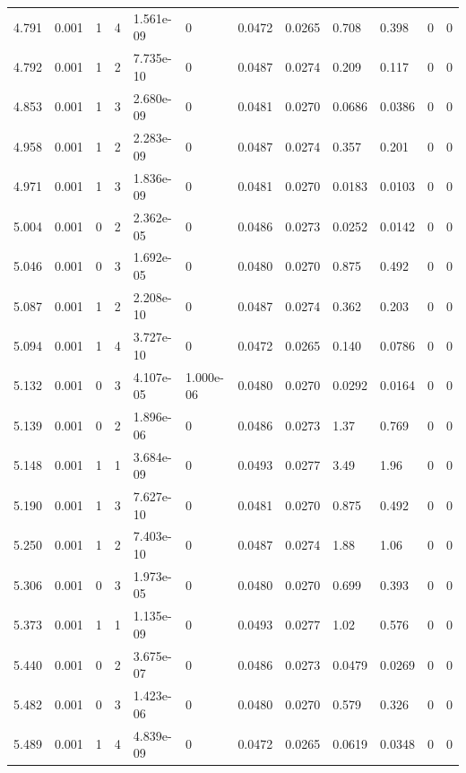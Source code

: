 \documentclass[preview]{standalone}
\begin{document}
{{{{\begin{tabular}{L{1.2cm}C{1.2cm} C{0.3cm}C{0.5cm} C{1.4cm}C{1.4cm} C{1.4cm}C{1.4cm} C{1.6cm}C{1.6cm} C{1.6cm}C{1.6cm}}
  4.791  &  0.001  & 1     &  4 &  1.561e-09  & 0  &  0.0472&   0.0265& 0.708 & 0.398   &  0 & 0  \\ 
  4.792  &  0.001  & 1     &  2 &  7.735e-10  & 0  &  0.0487&   0.0274& 0.209 & 0.117   &  0 & 0  \\ 
  4.853  &  0.001  & 1     &  3 &  2.680e-09  & 0  &  0.0481&   0.0270& 0.0686 & 0.0386   &  0 & 0  \\ 
  4.958  &  0.001  & 1     &  2 &  2.283e-09  & 0  &  0.0487&   0.0274& 0.357 & 0.201   &  0 & 0  \\ 
  4.971  &  0.001  & 1     &  3 &  1.836e-09  & 0  &  0.0481&   0.0270& 0.0183 & 0.0103   &  0 & 0  \\ 
  5.004  &  0.001  & 0     &  2 &  2.362e-05  & 0  &  0.0486&   0.0273& 0.0252 & 0.0142   &  0 & 0  \\ 
  5.046  &  0.001  & 0     &  3 &  1.692e-05  & 0  &  0.0480&   0.0270& 0.875 & 0.492   &  0 & 0  \\ 
  5.087  &  0.001  & 1     &  2 &  2.208e-10  & 0  &  0.0487&   0.0274& 0.362 & 0.203   &  0 & 0  \\ 
  5.094  &  0.001  & 1     &  4 &  3.727e-10  & 0  &  0.0472&   0.0265& 0.140 & 0.0786   &  0 & 0  \\ 
  5.132  &  0.001  & 0     &  3 &  4.107e-05  & 1.000e-06  &  0.0480&   0.0270& 0.0292 & 0.0164   &  0 & 0  \\ 
  5.139  &  0.001  & 0     &  2 &  1.896e-06  & 0  &  0.0486&   0.0273& 1.37 & 0.769   &  0 & 0  \\ 
  5.148  &  0.001  & 1     &  1 &  3.684e-09  & 0  &  0.0493&   0.0277& 3.49 & 1.96   &  0 & 0  \\ 
  5.190  &  0.001  & 1     &  3 &  7.627e-10  & 0  &  0.0481&   0.0270& 0.875 & 0.492   &  0 & 0  \\ 
  5.250  &  0.001  & 1     &  2 &  7.403e-10  & 0  &  0.0487&   0.0274& 1.88 & 1.06   &  0 & 0  \\ 
  5.306  &  0.001  & 0     &  3 &  1.973e-05  & 0  &  0.0480&   0.0270& 0.699 & 0.393   &  0 & 0  \\ 
  5.373  &  0.001  & 1     &  1 &  1.135e-09  & 0  &  0.0493&   0.0277& 1.02 & 0.576   &  0 & 0  \\ 
  5.440  &  0.001  & 0     &  2 &  3.675e-07  & 0  &  0.0486&   0.0273& 0.0479 & 0.0269   &  0 & 0  \\ 
  5.482  &  0.001  & 0     &  3 &  1.423e-06  & 0  &  0.0480&   0.0270& 0.579 & 0.326   &  0 & 0  \\ 
  5.489  &  0.001  & 1     &  4 &  4.839e-09  & 0  &  0.0472&   0.0265& 0.0619 & 0.0348   &  0 & 0  \\ 

\end{tabular}}}}}
\end{document}
